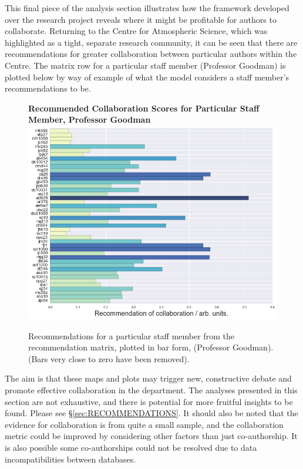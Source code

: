 This final piece of the analysis section illustrates how the framework developed over the research project reveals where it might be profitable for authors to collaborate. Returning to the Centre for Atmospheric Science, which was highlighted as a tight, separate research community, it can be seen that there are recommendations for greater collaboration between particular authors within the Centre. The matrix row for a particular staff member (Professor Goodman) is plotted below by way of example of what the model considers a staff member's recommendations to be.
\begin{center}
\begin{figure}[H]
  \centering
  \textbf{Recommended Collaboration Scores for Particular Staff Member, Professor Goodman}
    \includegraphics[width=\textwidth]{Analysis/jmg.png}
    \caption[Recommended Collaboration Scores for Particular Staff Member]{Recommendations for a particular staff member from the recommendation matrix, plotted in bar form, (Professor Goodman). (Bars very close to zero have been removed). }
    \label{fig:RECOMM_BAR}
\end{figure} 
\end{center}
The aim is that these maps and plots may trigger new, constructive debate and promote effective collaboration in the department. The analyses presented in this section are not exhaustive, and there is potential for more fruitful insights to be found. Please see \S\ref{sec:RECOMMENDATIONS}. It should also be noted that the evidence for collaboration is from quite a small sample, and the collaboration metric could be improved by considering other factors than just co-authorship. It is also possible some co-authorships could not be resolved due to data incompatibilities between databases.

